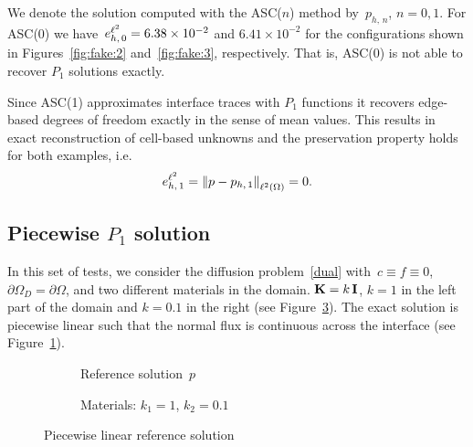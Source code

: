 We denote the solution computed  with the ASC($n$) method by~$p_{h,\,n}$, $n = 0, 1$. For ASC(0) we have~$e^{{\ell^2}}_{h,\,0} = 6.38 \times 10^{-2}$ and $6.41 \times 10^{-2}$ for the configurations shown in Figures~\ref{fig:fake:2} and~\ref{fig:fake:3}, respectively. That is, ASC(0) is not able to recover $P_1$ solutions exactly.

Since ASC(1) approximates interface traces with $P_1$ functions it recovers edge-based degrees of freedom exactly in the sense of mean values. This results in exact reconstruction of cell-based unknowns and the preservation property holds for both examples, i.e.
\begin{equation*}
	e^{{\ell^2}}_{h,\,1} = \left\| p - p_{h,\,1} \right\|_{{\ell^2\left({\Omega}\right)}} = 0.
\end{equation*}

\subsection{Piecewise $P_1$ solution}

In this set of tests, we consider the diffusion problem~\eqref{dual} with~$c \equiv f \equiv 0$, $\partial\Omega_D = \partial\Omega$, and two different materials in the domain. $\boldsymbol{\mathbf{K}} = k\,\boldsymbol{\mathbf{I}}$, $k = 1$ in the left part of the domain and $k = 0.1$ in the right (see Figure~\ref{fig:pwlin:mat}). The exact solution is piecewise linear such that the normal flux is continuous across the interface (see Figure~\ref{fig:pwlin:p}).
	
\begin{figure}[h!]
	\centering
	\label{fig:pwlin}
	\begin{subfigure}{.44\linewidth}
		\centering
		\caption{Reference solution~$p$}
		\label{fig:pwlin:p}
	\end{subfigure}%
	\hfill
	\begin{subfigure}{.4\linewidth}
		\centering
		\caption{Materials: $k_1 = 1$, $k_2 = 0.1$}
		\label{fig:pwlin:mat}
	\end{subfigure}
	\caption{Piecewise linear reference solution}
\end{figure}


